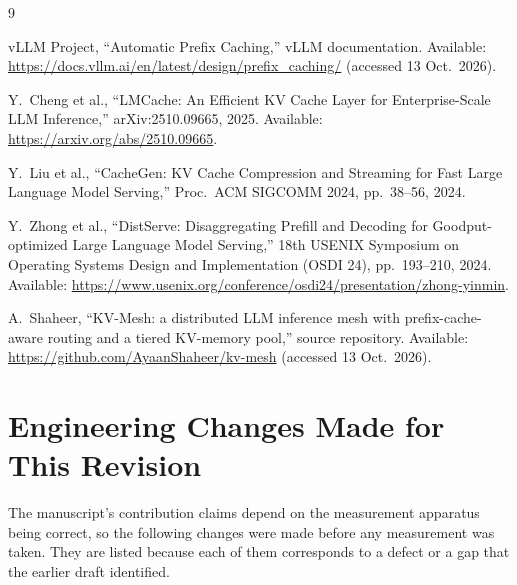 \documentclass[10pt,twocolumn]{article}
\begin{document}
\begin{thebibliography}{9}

vLLM Project, ``Automatic Prefix Caching,'' vLLM documentation.
Available: \url{https://docs.vllm.ai/en/latest/design/prefix_caching/}
(accessed 13 Oct.\ 2026).

Y.~Cheng et al., ``LMCache: An Efficient KV Cache Layer for Enterprise-Scale
LLM Inference,'' arXiv:2510.09665, 2025.
Available: \url{https://arxiv.org/abs/2510.09665}.

Y.~Liu et al., ``CacheGen: KV Cache Compression and Streaming for Fast Large
Language Model Serving,'' Proc.\ ACM SIGCOMM 2024, pp.~38--56, 2024.

Y.~Zhong et al., ``DistServe: Disaggregating Prefill and Decoding for
Goodput-optimized Large Language Model Serving,'' 18th USENIX Symposium on
Operating Systems Design and Implementation (OSDI 24), pp.~193--210, 2024.
Available: \url{https://www.usenix.org/conference/osdi24/presentation/zhong-yinmin}.

A.~Shaheer, ``KV-Mesh: a distributed LLM inference mesh with prefix-cache-aware
routing and a tiered KV-memory pool,'' source repository.
Available: \url{https://github.com/AyaanShaheer/kv-mesh}
(accessed 13 Oct.\ 2026).

\end{thebibliography}

\appendix

\section{Engineering Changes Made for This Revision}
\label{app:engineering}

The manuscript's contribution claims depend on the measurement apparatus being
correct, so the following changes were made before any measurement was taken.
They are listed because each of them corresponds to a defect or a gap that the
earlier draft identified.
\end{document}
